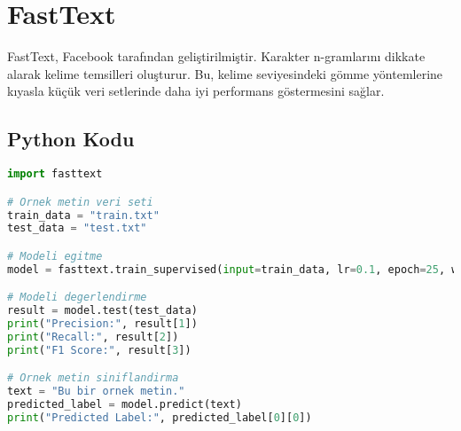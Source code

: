 \section{FastText}
FastText, Facebook tarafından geliştirilmiştir. Karakter n-gramlarını dikkate alarak kelime temsilleri oluşturur. Bu, kelime seviyesindeki gömme yöntemlerine kıyasla küçük veri setlerinde daha iyi performans göstermesini sağlar. 

\subsection{Python Kodu}

\begin{lstlisting}[language=Python]
import fasttext

# Ornek metin veri seti
train_data = "train.txt"
test_data = "test.txt"

# Modeli egitme
model = fasttext.train_supervised(input=train_data, lr=0.1, epoch=25, wordNgrams=2)

# Modeli degerlendirme
result = model.test(test_data)
print("Precision:", result[1])
print("Recall:", result[2])
print("F1 Score:", result[3])

# Ornek metin siniflandirma
text = "Bu bir ornek metin."
predicted_label = model.predict(text)
print("Predicted Label:", predicted_label[0][0])
\end{lstlisting}

\newpage
